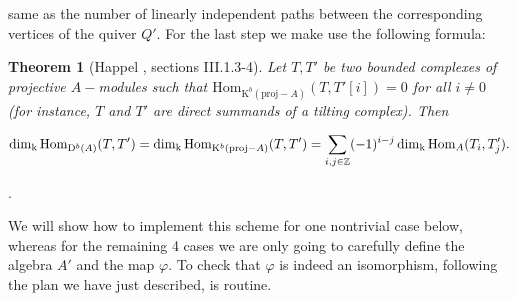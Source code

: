 \documentclass[12pt]{amsart}
\theoremstyle{plain}
\newtheorem{theorem}{Theorem}%
\theoremstyle{remark}
\theoremstyle{definition}
\newcommand{\proj}{{\mathrm{proj}}}
\newcommand{\Hom}{{\mathrm{Hom}}}
\newcommand{\D}{{\mathrm{D}}}
\newcommand{\K}{{\mathrm{K}}}
\def\kk{\mathrm{k}}
\begin{document}
same as the number of linearly independent paths between the corresponding vertices of the quiver $Q'$. For the last step we make use the following formula: 

\begin{theorem}[Happel \cite{Hap}, sections III.1.3-4]\label{thm:happel} Let $T,T'$ be two bounded complexes of projective $A-$modules such that $\Hom_{\K^b(\proj-A)}(T,T'[i]) = 0$ for all $i \neq 0$ (for instance, $T$ and $T'$ are direct summands of a tilting complex). Then 

$$\dim_{\kk} \Hom_{\D^b(A)}(T,T') = \dim_{\kk} \Hom_{\K^b(\proj-A)}(T,T') = \sum_{i,j \in \Z} (-1)^{i-j} \dim_{\kk} \Hom_A(T_i, T'_j). $$

\end{theorem}. 


We will show how to implement this scheme for one nontrivial case below, whereas for the remaining 4 cases we are only going to carefully define the algebra $A'$ and the map $\varphi$. To check that $\varphi$ is indeed an isomorphism, following the plan we have just described, is routine.  
\end{document}
